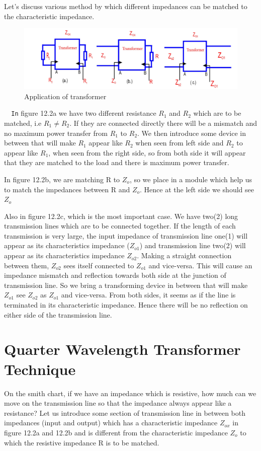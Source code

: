 Let's discuss various method by which different impedances can be matched to the characteristic impedance.
\begin{figure}[h]
\centering
\includegraphics[width=1\linewidth]{./graphics/fig8}
\caption{Application of transformer}
\end{figure}
\verb| 	In| figure 12.2a we have two different resistance $R_1$ and $R_2$ which are to be matched, i.e $R_1\neq R_2$. If they are connected directly there will be a mismatch and no maximum power transfer from $R_1$ to $R_2$. We then introduce some  device in between that will make $R_1$ appear like $R_2$ when seen  from left side and $R_2$ to appear like  $R_1$, when seen from the right side, so from both side it will appear that they are matched to the load and there is maximum power transfer.

In figure 12.2b, we are matching R to $Z_o$, so we place in a module which help us to match the impedances between R and $Z_o$. Hence at the left side we should see $ Z_o$

Also in figure 12.2c, which is the most important case. We have two(2) long transmission lines which are to be connected together. If the length of each transmission is very large, the input impedance of transmission line one(1) will appear as its characteristics impedance ($ Z_{o1}$) and transmission line two(2) will appear as its characteristics impedance $ Z_{o2}$. Making a straight connection between them,  $ Z_{o2}$ sees itself connected to $ Z_{o1}$ and vice-versa. This will cause an impedance mismatch and reflection towards both side at the junction of transmission line. So we bring a transforming device in between that will make  $Z_{o1}$ see $Z_{o2}$ as $Z_{o1}$ and vice-versa. From both sides, it seems as if the line is terminated in its characteristic impedance. Hence there will be no reflection on either side of the transmission line.

\section{Quarter Wavelength Transformer Technique}
On the smith chart, if we have an impedance which is resistive, how much can we move on the transmission line so that the impedance always appear like a resistance? Let us introduce some section of transmission line in between both impedances (input and output) which has a characteristic impedance $ Z_{ox}$ in figure 12.2a and 12.2b  and is different from the characteristic impedance  $ Z_o$ to which the resistive impedance R is to be matched.

